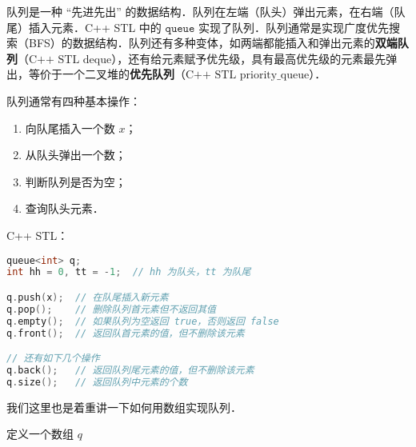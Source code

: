 
队列是一种 “先进先出” 的数据结构．队列在左端（队头）弹出元素，在右端（队尾）插入元素．C++ STL 中的 $\mathtt{queue}$ 实现了队列．队列通常是实现广度优先搜索（BFS）的数据结构．队列还有多种变体，如两端都能插入和弹出元素的\textbf{双端队列}（$\text{C++ STL deque}$），还有给元素赋予优先级，具有最高优先级的元素最先弹出，等价于一个二叉堆的\textbf{优先队列}（$\text{C++ STL priority_queue}$）．

队列通常有四种基本操作：

\begin{enumerate}
\item 向队尾插入一个数 $x$；
\item 从队头弹出一个数；
\item 判断队列是否为空；
\item 查询队头元素．
\end{enumerate}

C++ STL：

\begin{lstlisting}[language=cpp]
queue<int> q;
int hh = 0, tt = -1;  // hh 为队头，tt 为队尾

q.push(x);  // 在队尾插入新元素
q.pop();    // 删除队列首元素但不返回其值
q.empty();  // 如果队列为空返回 true，否则返回 false
q.front();  // 返回队首元素的值，但不删除该元素

// 还有如下几个操作
q.back();   // 返回队列尾元素的值，但不删除该元素
q.size();   // 返回队列中元素的个数

\end{lstlisting}

我们这里也是着重讲一下如何用数组实现队列．

定义一个数组 $q$